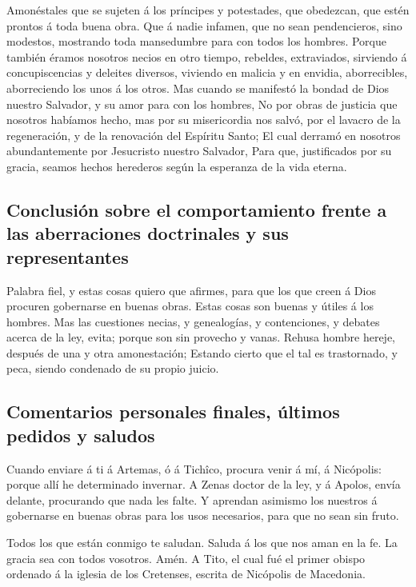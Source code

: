  Amonéstales que se sujeten á los príncipes y potestades,
que obedezcan, que estén prontos á toda buena obra.  Que á
nadie infamen, que no sean pendencieros, sino modestos, mostrando toda
mansedumbre para con todos los hombres.  Porque también
éramos nosotros necios en otro tiempo, rebeldes, extraviados, sirviendo
á concupiscencias y deleites diversos, viviendo en malicia y en envidia,
aborrecibles, aborreciendo los unos á los otros.  Mas
cuando se manifestó la bondad de Dios nuestro Salvador, y su amor para
con los hombres,  No por obras de justicia que nosotros
habíamos hecho, mas por su misericordia nos salvó, por el lavacro de la
regeneración, y de la renovación del Espíritu Santo;  El
cual derramó en nosotros abundantemente por Jesucristo nuestro Salvador,
 Para que, justificados por su gracia, seamos hechos
herederos según la esperanza de la vida eterna.

\hypertarget{conclusiuxf3n-sobre-el-comportamiento-frente-a-las-aberraciones-doctrinales-y-sus-representantes}{%
\subsection{Conclusión sobre el comportamiento frente a las aberraciones
doctrinales y sus
representantes}\label{conclusiuxf3n-sobre-el-comportamiento-frente-a-las-aberraciones-doctrinales-y-sus-representantes}}

 Palabra fiel, y estas cosas quiero que afirmes, para que
los que creen á Dios procuren gobernarse en buenas obras. Estas cosas
son buenas y útiles á los hombres.  Mas las cuestiones
necias, y genealogías, y contenciones, y debates acerca de la ley,
evita; porque son sin provecho y vanas.  Rehusa hombre
hereje, después de una y otra amonestación;  Estando
cierto que el tal es trastornado, y peca, siendo condenado de su propio
juicio.

\hypertarget{comentarios-personales-finales-uxfaltimos-pedidos-y-saludos}{%
\subsection{Comentarios personales finales, últimos pedidos y
saludos}\label{comentarios-personales-finales-uxfaltimos-pedidos-y-saludos}}

 Cuando enviare á ti á Artemas, ó á Tichîco, procura
venir á mí, á Nicópolis: porque allí he determinado invernar.
 A Zenas doctor de la ley, y á Apolos, envía delante,
procurando que nada les falte.  Y aprendan asimismo los
nuestros á gobernarse en buenas obras para los usos necesarios, para que
no sean sin fruto.

 Todos los que están conmigo te saludan. Saluda á los que
nos aman en la fe. La gracia sea con todos vosotros. Amén. A Tito, el
cual fué el primer obispo ordenado á la iglesia de los Cretenses,
escrita de Nicópolis de Macedonia.
